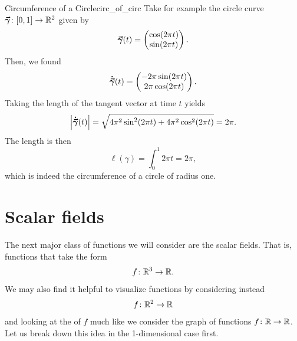         \begin{ex}{Circumference of a Circle}{circ_of_circ}
        	Take for example the circle curve $\boldsymbol{\vec{\gamma}} \colon [0,1] \to \mathbb{R}^2$ given by
        	\[
        	\boldsymbol{\vec{\gamma}}(t) = \begin{pmatrix} \cos(2\pi t) \\ \sin(2\pi t) \end{pmatrix}.
        	\]
        	Then, we found 
        	\[
        	\boldsymbol{\dot{\vec{\gamma}}}(t) = \begin{pmatrix} -2\pi \sin(2\pi t) \\ 2\pi \cos(2 \pi t) \end{pmatrix}.
        	\]
        	Taking the length of the tangent vector at time $t$ yields
        	\[
        	\left| \boldsymbol{\dot{\vec{\gamma}}}(t) \right| = \sqrt{4\pi^2 \sin^2(2\pi t) + 4\pi^2 \cos^2(2\pi t) } = 2\pi.
        	\]
        	The length is then
        	\[
        	\ell(\gamma) = \int_0^1 2 \pi t  = 2\pi,
        	\]
        	which is indeed the circumference of a circle of radius one.
        \end{ex}
                
                \section{Scalar fields}
                The next major class of functions we will consider are the scalar fields.  That is, functions that take the form
                \[
                f\colon \mathbb{R}^3 \to \mathbb{R}.
                \]
                We may also find it helpful to visualize functions by considering instead
                \[
                f\colon \mathbb{R}^2 \to \mathbb{R}
                \]
                and looking at the  of $f$ much like we consider the graph of functions $f\colon \mathbb{R} \to \mathbb{R}$. Let us break down this idea in the 1-dimensional case first.  
                
